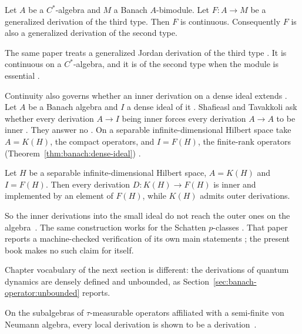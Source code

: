 \begin{theorem}\label{thm:banach:three-types}
Let $A$ be a $C^*$-algebra and $M$ a Banach $A$-bimodule. Let $F\colon A\to M$
be a generalized derivation of the third type. Then $F$ is continuous.
Consequently $F$ is also a generalized derivation of the second type.
\end{theorem}

The same paper treats a generalized Jordan derivation of the third type
\cite[p.~5]{HosseiniPeraltaSu2025}. It is continuous on a $C^*$-algebra, and
it is of the second type when the module is essential \cite[Theorem~3.1,
p.~5]{HosseiniPeraltaSu2025}.

Continuity also governs whether an inner derivation on a dense ideal extends
\cite[p.~1]{ShafieaslTavakkoli2026}. Let $A$ be a Banach algebra and $I$ a
dense ideal of it \cite[p.~1]{ShafieaslTavakkoli2026}. Shafieasl and Tavakkoli
ask whether every derivation $A\to I$ being inner forces every derivation
$A\to A$ to be inner \cite[p.~1]{ShafieaslTavakkoli2026}. They answer no
\cite[p.~1]{ShafieaslTavakkoli2026}. On a separable infinite-dimensional
Hilbert space take $A=K(H)$, the compact operators, and $I=F(H)$, the
finite-rank operators (Theorem~\ref{thm:banach:dense-ideal})
\cite[p.~3]{ShafieaslTavakkoli2026}.

\begin{theorem}\label{thm:banach:dense-ideal}
Let $H$ be a separable infinite-dimensional Hilbert space, $A=K(H)$ and
$I=F(H)$. Then every derivation $D\colon K(H)\to F(H)$ is inner and
implemented by an element of $F(H)$, while $K(H)$ admits outer derivations.
\end{theorem}

So the inner derivations into the small ideal do not reach the outer ones on
the algebra~\cite[p.~1]{ShafieaslTavakkoli2026}. The same construction works for the Schatten $p$-classes
\cite[Theorem~5.1, p.~4]{ShafieaslTavakkoli2026}. That paper reports a
machine-checked verification of its own main statements
\cite[p.~1]{ShafieaslTavakkoli2026}; the present book makes no such claim for
itself.

Chapter vocabulary of the next section is different:
the derivations of quantum dynamics are densely defined and unbounded, as
Section~\ref{sec:banach-operator:unbounded} reports.

On the subalgebras of $\tau$-measurable operators affiliated with a
semi-finite von Neumann algebra, every local derivation is shown to be a
derivation~\cite{WlLocalDerivationsOn2015}.

